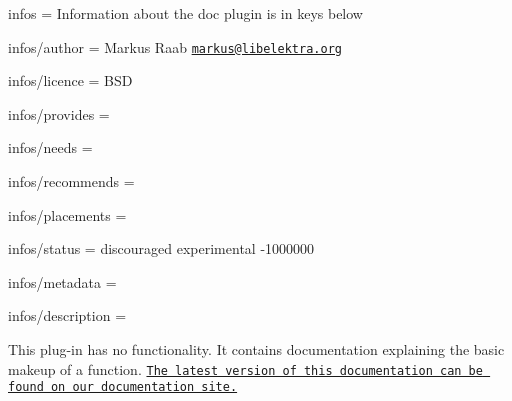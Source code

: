 
\begin{DoxyItemize}
\item infos = Information about the doc plugin is in keys below
\item infos/author = Markus Raab \href{mailto:markus@libelektra.org}{\tt markus@libelektra.\+org}
\item infos/licence = B\+S\+D
\item infos/provides =
\item infos/needs =
\item infos/recommends =
\item infos/placements =
\item infos/status = discouraged experimental -\/1000000
\item infos/metadata =
\item infos/description =
\end{DoxyItemize}

This plug-\/in has no functionality. It contains documentation explaining the basic makeup of a function. \href{http://doc.libelektra.org/api/latest/html/group__plugin.html}{\tt The latest version of this documentation can be found on our documentation site.} 